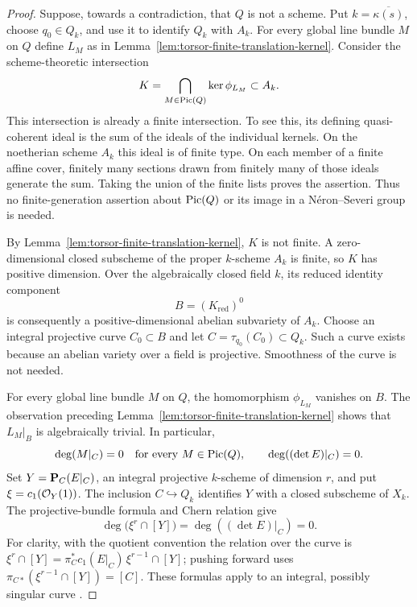 \begin{proof}
Suppose, towards a contradiction, that $Q$ is not a scheme. Put
$k=\overline{\kappa(s)}$, choose $q_0\in Q_k$, and use it to
identify $Q_k$ with $A_k$. For every global line bundle $M$ on $Q$
define $L_M$ as in Lemma~\ref{lem:torsor-finite-translation-kernel}.
Consider the scheme-theoretic intersection
\[
 K=\bigcap_{M\in\operatorname{Pic}(Q)}\ker\phi_{L_M}\subset A_k.
\]
This intersection is already a finite intersection. To see this,
its defining quasi-coherent ideal is the sum of the ideals of the
individual kernels. On the noetherian scheme $A_k$ this ideal is
of finite type. On each member of a finite affine cover, finitely
many sections drawn from finitely many of those ideals generate
the sum. Taking the union of the finite lists proves the assertion.
Thus no finite-generation assertion about $\operatorname{Pic}(Q)$ or its image
in a N\'eron--Severi group is needed.

By Lemma~\ref{lem:torsor-finite-translation-kernel}, $K$ is not
finite. A zero-dimensional closed subscheme of the proper
$k$-scheme $A_k$ is finite, so $K$ has positive dimension. Over the
algebraically closed field $k$, its reduced identity component
\[
 B=(K_{\mathrm{red}})^0
\]
is consequently a positive-dimensional abelian subvariety of $A_k$.
Choose an integral projective curve $C_0\subset B$ and let
$C=\tau_{q_0}(C_0)\subset Q_k$. Such a curve exists because an
abelian variety over a field is projective. Smoothness of the curve
is not needed.

For every global line bundle $M$ on $Q$, the homomorphism
$\phi_{L_M}$ vanishes on $B$. The observation preceding
Lemma~\ref{lem:torsor-finite-translation-kernel} shows that
$L_M|_B$ is algebraically trivial. In particular,
\begin{equation}\label{eq:torsor-curve-degrees-zero}
 \deg(M|_C)=0\quad\text{for every }M\in\operatorname{Pic}(Q),
 \qquad \deg((\det E)|_C)=0.
\end{equation}
Set $Y=\mathbf P_C(E|_C)$, an integral projective $k$-scheme of dimension
$r$, and put $\xi=c_1(\mathcal O_Y(1))$. The inclusion $C\hookrightarrow
Q_k$ identifies $Y$ with a closed subscheme of $X_k$.
The projective-bundle formula and Chern relation give
\begin{equation}\label{eq:torsor-bundle-top-intersection-zero}
 \deg\bigl(\xi^r\cap[Y]\bigr)
   =\deg((\det E)|_C)=0.
\end{equation}
For clarity, with the quotient convention the relation over the
curve is
$\xi^r\cap[Y]=\pi_C^*c_1(E|_C)\,\xi^{r-1}\cap[Y]$;
pushing forward uses
$\pi_{C*}(\xi^{r-1}\cap[Y])=[C]$.
These formulas apply to an integral, possibly singular curve
\cite[Tags~02TX and~02TZ, equation~(42.37.1.1)]{Stacks}.


\end{proof}
